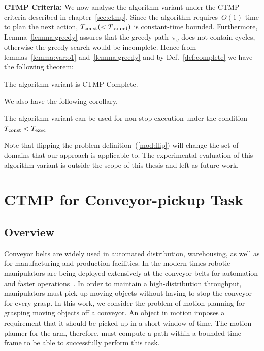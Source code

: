 \documentclass[a4paper]{report}
\begin{document}
\textbf{CTMP Criteria:} We now analyse the algorithm variant under the CTMP criteria described in chapter~\ref{sec:ctmp}. Since the algorithm requires~$O(1)$ time to plan the next action, $T_\textrm{const} (< T_{\textrm{bound}})$ is constant-time bounded.
%
Furthermore, Lemma~\ref{lemma:greedy} assures that the greedy path~$\pi_g$ does not contain cycles, otherwise the greedy search would be incomplete. Hence from lemmas~\ref{lemma:var:o1} and~\ref{lemma:greedy} and by Def.~\ref{def:complete} we have the following theorem:

\vspace{2mm}
\begin{theorem}
	The algorithm variant is CTMP-Complete.
\end{theorem}

We also have the following corollary.

\vspace{2mm}
\begin{cor}
	The algorithm variant can be used for non-stop execution under the condition~$T_{\textrm{const}} < T_{\textrm{exec}}$
\end{cor}

Note that flipping the problem definition~(\ref{mod:flip}) will change the set of domains that our approach is applicable to. The experimental evaluation of this algorithm variant is outside the scope of this thesis and left as future work.

\newpage
\chapter{CTMP for Conveyor-pickup Task}
\label{sec:rss}
\section{Overview}
Conveyor belts are widely used in automated distribution, warehousing, as well as for manufacturing and production facilities. In the modern times robotic manipulators are being deployed extensively at the conveyor belts for automation and faster operations~\cite{zhang2018gilbreth}. In order to maintain a high-distribution throughput, manipulators must pick up moving objects without having to stop the conveyor for every grasp. In this work, we consider the problem of motion planning for grasping moving objects off a conveyor. An object in motion imposes a requirement that it should be picked up in a short window of time. The motion planner for the arm, therefore, must compute a path within a bounded time frame to be able to successfully perform this task.
\end{document}
